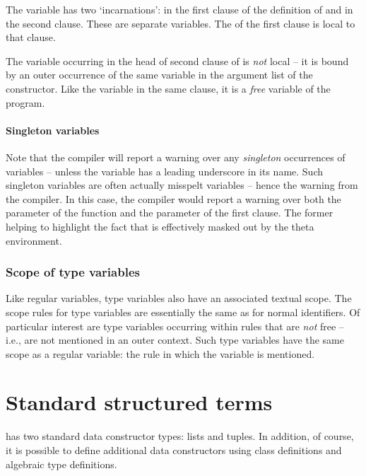 The  variable has two `incarnations': in the first clause of the definition of  and in the second clause. These are separate variables. The  of the first clause is local to that clause.

The  variable occurring in the head of second clause of  is \emph{not} local -- it is bound by an outer occurrence of the same variable in the argument list of the  constructor. Like the  variable in the same clause, it is a \emph{free} variable of the  program.

\paragraph{Singleton variables}
Note that the compiler will report a warning over any \emph{singleton} occurrences of variables -- unless the variable has a leading underscore in its name. Such singleton variables are often actually misspelt variables -- hence the warning from the compiler. In this case, the compiler would report a warning over both the  parameter of the function and the  parameter of the first  clause. The former helping to highlight the fact that  is effectively masked out by the theta environment.

\subsubsection{Scope of type variables}
Like regular variables, type variables also have an associated textual scope. The scope rules for type variables are essentially the same as for normal identifiers. Of particular interest are type variables occurring within rules that are \emph{not} free -- i.e., are not mentioned in an outer context. Such type variables have the same scope as a regular variable: the rule in which the variable is mentioned.

\section{Standard structured terms}
\label{expression:structured}

\go has two standard data constructor types: lists and tuples. In addition, of course, it is possible to define additional data constructors using class definitions and algebraic type definitions.

